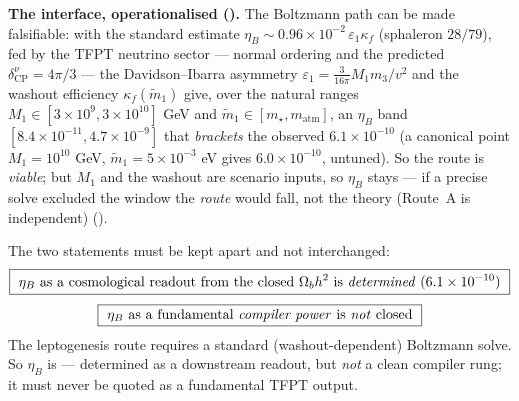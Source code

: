 \noindent\textbf{The interface, operationalised (\mC).} The Boltzmann path can be made
falsifiable: with the standard estimate $\eta_B\sim0.96\times10^{-2}\,\varepsilon_1\kappa_f$
(sphaleron $28/79$), fed by the TFPT neutrino sector --- normal ordering and the predicted
$\delta^\nu_{\mathrm{CP}}=4\pi/3$ --- the Davidson--Ibarra asymmetry
$\varepsilon_1=\tfrac{3}{16\pi}M_1 m_3/v^2$ and the washout efficiency $\kappa_f(\tilde m_1)$ give,
over the natural ranges $M_1\in[3\times10^9,3\times10^{10}]$ GeV and
$\tilde m_1\in[m_\star,m_{\mathrm{atm}}]$, an $\eta_B$ band $[8.4\times10^{-11},4.7\times10^{-9}]$
that \emph{brackets} the observed $6.1\times10^{-10}$ (a canonical point $M_1=10^{10}$ GeV,
$\tilde m_1=5\times10^{-3}$ eV gives $6.0\times10^{-10}$, untuned). So the route is \emph{viable};
but $M_1$ and the washout are scenario inputs, so $\eta_B$ stays \mC --- if a precise solve
excluded the window the \emph{route} would fall, not the theory (Route~A is independent)
().

\begin{keybox}
The two statements must be kept apart and not interchanged:
\[
  \boxed{\ \eta_B\ \text{as a cosmological readout from the closed }\Omega_b h^2\ \text{is \emph{determined}}\ (6.1\times10^{-10})\ }
\]
\[
  \boxed{\ \eta_B\ \text{as a fundamental \emph{compiler power} is \emph{not} closed}\ }
\]
The leptogenesis route requires a standard (washout-dependent) Boltzmann solve. So $\eta_B$ is \mC ---
determined as a downstream readout, but \emph{not} a clean compiler rung; it must never be quoted as a
fundamental TFPT output.
\end{keybox}

